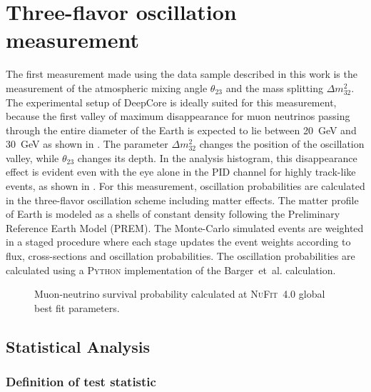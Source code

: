 \chapter{Three-flavor oscillation measurement}
\setchapterpreamble[u]{\margintoc}

The first measurement made using the data sample described in this work is the measurement of the atmospheric mixing angle $\theta_{23}$ and the mass splitting $\Delta m^2_{32}$. The experimental setup of DeepCore is ideally suited for this measurement, because the first valley of maximum disappearance for muon neutrinos passing through the entire diameter of the Earth is expected to lie between 20~GeV and 30~GeV as shown in . The parameter $\Delta m^2_{32}$ changes the position of the oscillation valley, while $\theta_{23}$ changes its depth. In the analysis histogram, this disappearance effect is evident even with the eye alone in the PID channel for highly track-like events, as shown in . For this measurement, oscillation probabilities are calculated in the three-flavor oscillation scheme including matter effects. The matter profile of Earth is modeled as a shells of constant density following the Preliminary Reference Earth Model (PREM). The Monte-Carlo simulated events are weighted in a staged procedure where each stage updates the event weights according to flux, cross-sections and oscillation probabilities. The oscillation probabilities are calculated using a \textsc{Python} implementation of the Barger~et~al. calculation.

\begin{figure}
    \centering
    
    \caption{Muon-neutrino survival probability calculated at \textsc{NuFit~4.0}\cite{nufit40} global best fit parameters.}
    \label{fig:three-flavor-oscprob}
\end{figure}

\section{Statistical Analysis}

\subsection{Definition of test statistic}
\label{sec:test-statistic}

